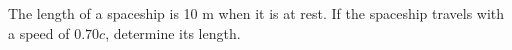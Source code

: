 The length of a spaceship is 10 m when it is at rest. 
If the spaceship travels with a speed of $0.70c$, determine its length. %